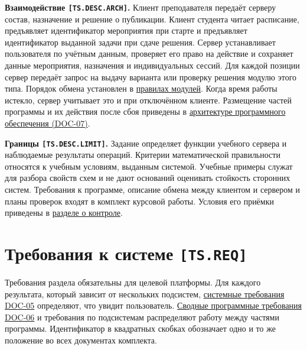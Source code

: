\documentclass[12pt,a4paper]{article}
\begin{document}
\hypertarget{ts-desc-arch}{} \textbf{Взаимодействие \texttt{[TS.\allowbreak{}DESC.\allowbreak{}ARCH]}.} Клиент преподавателя передаёт серверу состав, назначение и решение о публикации. Клиент студента читает расписание, предъявляет идентификатор мероприятия при старте и предъявляет идентификатор выданной задачи при сдаче решения. Сервер устанавливает пользователя по учётным данным, проверяет его право на действие и сохраняет данные мероприятия, назначения и индивидуальных сессий. Для каждой позиции сервер передаёт запрос на выдачу варианта или проверку решения модулю этого типа. Порядок обмена установлен в {\hyperlink{ts-req-func-task-module}{правилах модулей}}. Когда время работы истекло, сервер учитывает это и при отключённом клиенте. Размещение частей программы и их действия после сбоя приведены в {\href{../09\_Архитектура\_и\_API/DOC-07\_Архитектура.pdf\#doc-07-архитектура-по}{архитектуре программного обеспечения (DOC-07)}}.

\hypertarget{ts-desc-limit}{} \textbf{Границы \texttt{[TS.\allowbreak{}DESC.\allowbreak{}LIMIT]}.} Задание определяет функции учебного сервера и наблюдаемые результаты операций. Критерии математической правильности относятся к учебным условиям, выданным системой. Учебные примеры служат для разбора свойств схем и не дают оснований оценивать стойкость сторонних систем. Требования к программе, описание обмена между клиентом и сервером и планы проверок входят в комплект курсовой работы. Условия его приёмки приведены в {\hyperlink{ts-test-accept}{разделе о контроле}}.

\section{\texorpdfstring{Требования к системе \texttt{{[}TS.REQ{]}}}{Требования к системе {[}TS.REQ{]}}}\label{3-ux442ux440ux435ux431ux43eux432ux430ux43dux438ux44f-ux43a-ux441ux438ux441ux442ux435ux43cux435-tsreq}

\hypertarget{3-требования-к-системе-tsreq}{}

\hypertarget{ts-req}{}

Требования раздела обязательны для целевой платформы. Для каждого результата, который зависит от нескольких подсистем, {\href{../04\_Системные\_требования/DOC-05\_Системные\_требования.pdf\#doc-05-системные-требования}{системные требования DOC-05}} определяют, что увидит пользователь. {\href{../07\_Программные\_требования/DOC-06\_Программные\_требования.pdf\#doc-06-сводные-программные-требования}{Сводные программные требования DOC-06}} и требования по подсистемам распределяют работу между частями программы. Идентификатор в квадратных скобках обозначает одно и то же положение во всех документах комплекта.
\end{document}
